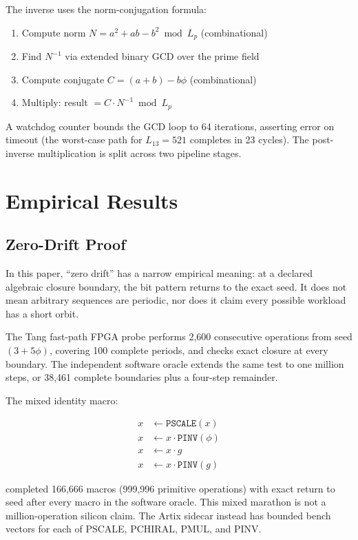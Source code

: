 \documentclass[conference]{IEEEtran}
\begin{document}
The inverse uses the norm-conjugation formula:
\begin{enumerate}
    \item Compute norm $N = a^2 + ab - b^2 \bmod L_p$ (combinational)
    \item Find $N^{-1}$ via extended binary GCD over the prime field
    \item Compute conjugate $C = (a+b) - b\phi$ (combinational)
    \item Multiply: result $= C \cdot N^{-1} \bmod L_p$
\end{enumerate}

A watchdog counter bounds the GCD loop to 64 iterations, asserting error on timeout (the worst-case path for $L_{13}=521$ completes in 23 cycles). The post-inverse multiplication is split across two pipeline stages.

\section{Empirical Results}

\subsection{Zero-Drift Proof}

In this paper, ``zero drift'' has a narrow empirical meaning: at a declared algebraic closure boundary, the bit pattern returns to the exact seed. It does not mean arbitrary sequences are periodic, nor does it claim every possible workload has a short orbit.

The Tang fast-path FPGA probe performs 2,600 consecutive operations from seed
$(3+5\phi)$, covering 100 complete periods, and checks exact closure at every
boundary. The independent software oracle extends the same test to one million
steps, or 38,461 complete boundaries plus a four-step remainder.

The mixed identity macro:

\begin{align*}
x &\leftarrow \texttt{PSCALE}(x) \\
x &\leftarrow x \cdot \texttt{PINV}(\phi) \\
x &\leftarrow x \cdot g \\
x &\leftarrow x \cdot \texttt{PINV}(g)
\end{align*}

completed 166,666 macros (999,996 primitive operations) with exact return to
seed after every macro in the software oracle. This mixed marathon is not a
million-operation silicon claim. The Artix sidecar instead has bounded bench
vectors for each of PSCALE, PCHIRAL, PMUL, and PINV.
\end{document}
